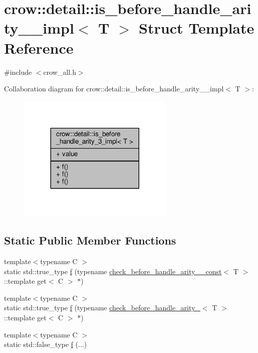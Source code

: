 \hypertarget{structcrow_1_1detail_1_1is__before__handle__arity__3__impl}{\section{crow\-:\-:detail\-:\-:is\-\_\-before\-\_\-handle\-\_\-arity\-\_\-\_\-impl$<$ T $>$ Struct Template Reference}
\label{structcrow_1_1detail_1_1is__before__handle__arity__3__impl}
}


{\ttfamily \#include $<$crow\-\_\-all.\-h$>$}



Collaboration diagram for crow\-:\-:detail\-:\-:is\-\_\-before\-\_\-handle\-\_\-arity\-\_\-\_\-impl$<$ T $>$\-:
\nopagebreak
\begin{figure}[H]
\begin{center}
\leavevmode
\includegraphics[width=212pt]{structcrow_1_1detail_1_1is__before__handle__arity__3__impl__coll__graph}
\end{center}
\end{figure}
\subsection*{Static Public Member Functions}
\begin{DoxyCompactItemize}
\item 
{\footnotesize template$<$typename C $>$ }\\static std\-::true\-\_\-type \hyperlink{structcrow_1_1detail_1_1is__before__handle__arity__3__impl_ab654f561c3278d502576fcc0613b7b6f}{f} (typename \hyperlink{structcrow_1_1detail_1_1check__before__handle__arity__3__const}{check\-\_\-before\-\_\-handle\-\_\-arity\-\_\-\_\-const}$<$ T $>$\-::template get$<$ C $>$ $\ast$)
\item 
{\footnotesize template$<$typename C $>$ }\\static std\-::true\-\_\-type \hyperlink{structcrow_1_1detail_1_1is__before__handle__arity__3__impl_af18b77a64cdf6ff70c8a27cac3dc44d8}{f} (typename \hyperlink{structcrow_1_1detail_1_1check__before__handle__arity__3}{check\-\_\-before\-\_\-handle\-\_\-arity\-\_}$<$ T $>$\-::template get$<$ C $>$ $\ast$)
\item 
{\footnotesize template$<$typename C $>$ }\\static std\-::false\-\_\-type \hyperlink{structcrow_1_1detail_1_1is__before__handle__arity__3__impl_a67e0a251ef0d3685579bbb88bfb2699d}{f} (...)
\end{DoxyCompactItemize}
